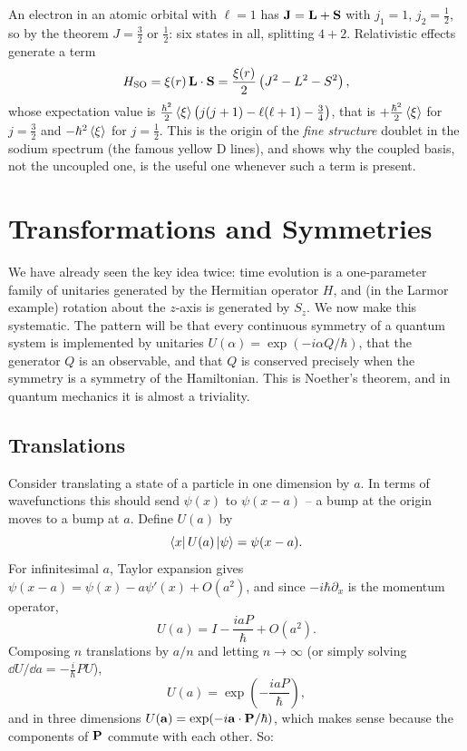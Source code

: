 \documentclass[a4paper]{scrartcl}
\begin{document}
\begin{example}
    An electron in an atomic orbital with $\ell = 1$ has $\mathbf{J} = \mathbf{L} + \mathbf{S}$ with $j_1 = 1$, $j_2 = \frac12$, so by the theorem $J = \frac32$ or $\frac12$: six states in all, splitting $4+2$. Relativistic effects generate a term
    $$
    H_{\mathrm{SO}} = \xi(r)\, \mathbf{L} \cdot \mathbf{S} = \frac{\xi(r)}{2}\left( J^2 - L^2 - S^2 \right),
    $$
    whose expectation value is $\frac{\hbar^2}{2}\expval{\xi}\left(j(j+1)-\ell(\ell+1)-\frac34\right)$, that is $+\frac{\hbar^2}{2}\expval\xi$ for $j = \frac32$ and $-\hbar^2\expval\xi$ for $j = \frac12$. This is the origin of the \emph{fine structure} doublet in the sodium spectrum (the famous yellow D lines), and shows why the coupled basis, not the uncoupled one, is the useful one whenever such a term is present.
\end{example}

\section{Transformations and Symmetries}\label{sec:symmetry}

We have already seen the key idea twice: time evolution is a one-parameter family of unitaries generated by the Hermitian operator $H$, and (in the Larmor example) rotation about the $z$-axis is generated by $S_z$. We now make this systematic. The pattern will be that every continuous symmetry of a quantum system is implemented by unitaries $U(\alpha) = \exp(-i\alpha Q/\hbar)$, that the generator $Q$ is an observable, and that $Q$ is conserved precisely when the symmetry is a symmetry of the Hamiltonian. This is Noether's theorem, and in quantum mechanics it is almost a triviality.

\subsection{Translations}

Consider translating a state of a particle in one dimension by $a$. In terms of wavefunctions this should send $\psi(x)$ to $\psi(x-a)$ -- a bump at the origin moves to a bump at $a$. Define $U(a)$ by
$$
\bra{x}U(a)\ket{\psi} = \psi(x - a).
$$
For infinitesimal $a$, Taylor expansion gives $\psi(x-a) = \psi(x) - a\psi'(x) + O(a^2)$, and since $-i\hbar\partial_x$ is the momentum operator,
$$
U(a) = I - \frac{i a P}{\hbar} + O(a^2).
$$
Composing $n$ translations by $a/n$ and letting $n \to \infty$ (or simply solving $\dd U/\dd a = -\frac{i}{\hbar}PU$),
$$
U(a) = \exp\left(-\frac{iaP}{\hbar}\right),
$$
and in three dimensions $U(\mathbf{a}) = \exp(-i\mathbf{a} \cdot \mathbf{P}/\hbar)$, which makes sense because the components of $\mathbf{P}$ commute with each other. So:
\end{document}
